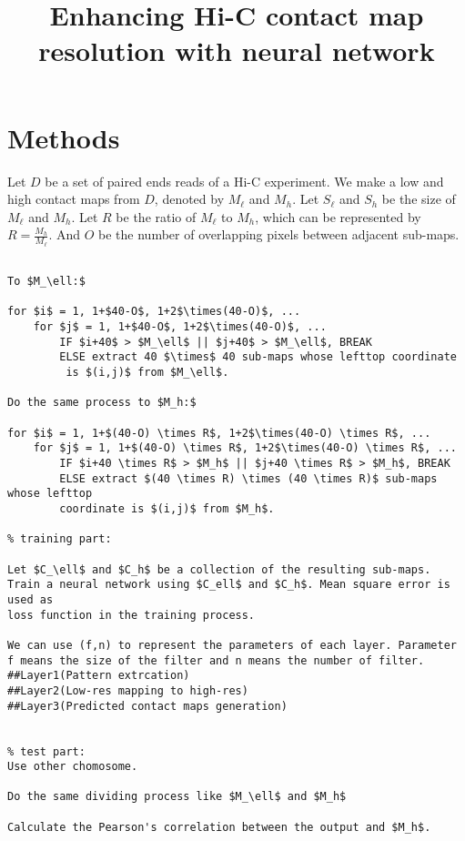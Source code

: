 \documentclass{article}
\begin{document}
\title{Enhancing Hi-C contact map resolution with neural network}
\author{}
\maketitle



\section{Methods}


Let $D$ be a set of paired ends reads of a Hi-C experiment. 
We make a low and high contact maps from $D$, denoted by $M_\ell$ and $M_h$. 
Let $S_\ell$ and $S_h$ be the size of $M_\ell$ and $M_h$. 
Let $R$ be the ratio of $M_\ell$ to $M_h$, which can be represented by
$R = \frac{M_h}{M_\ell}$. And $O$ be the number of overlapping pixels between adjacent sub-maps.

\begin{Verbatim}[commandchars=\\\{\},codes={\catcode`$=3\catcode`_=8}]
% Divide matrices $M_\ell$ and $M_h$ \

To $M_\ell:$

for $i$ = 1, 1+$40-O$, 1+2$\times(40-O)$, ...
    for $j$ = 1, 1+$40-O$, 1+2$\times(40-O)$, ...
        IF $i+40$ > $M_\ell$ || $j+40$ > $M_\ell$, BREAK 
        ELSE extract 40 $\times$ 40 sub-maps whose lefttop coordinate
         is $(i,j)$ from $M_\ell$.

Do the same process to $M_h:$

for $i$ = 1, 1+$(40-O) \times R$, 1+2$\times(40-O) \times R$, ...
    for $j$ = 1, 1+$(40-O) \times R$, 1+2$\times(40-O) \times R$, ...
        IF $i+40 \times R$ > $M_h$ || $j+40 \times R$ > $M_h$, BREAK 
        ELSE extract $(40 \times R) \times (40 \times R)$ sub-maps whose lefttop 
        coordinate is $(i,j)$ from $M_h$.

% training part: 

Let $C_\ell$ and $C_h$ be a collection of the resulting sub-maps. 
Train a neural network using $C_ell$ and $C_h$. Mean square error is used as 
loss function in the training process. 

We can use (f,n) to represent the parameters of each layer. Parameter f means the size of the filter and n means the number of filter. 
##Layer1(Pattern extrcation)
##Layer2(Low-res mapping to high-res)
##Layer3(Predicted contact maps generation)


% test part: 
Use other chomosome. 

Do the same dividing process like $M_\ell$ and $M_h$

Calculate the Pearson's correlation between the output and $M_h$.

\end{Verbatim}
\end{document}
